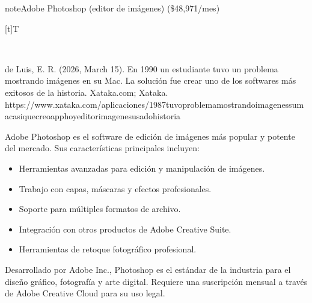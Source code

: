\documentclass[letterpaper,10pt,spanish]{sphinxmanual}
\let\sphinxpxdimen\pdfpxdimen\else\newdimen\sphinxpxdimen
\begin{document}
\begin{sphinxadmonition}{note}{Adobe Photoshop (editor de imágenes) (\$48,971/mes)}


\begin{savenotes}\sphinxattablestart
\sphinxthistablewithglobalstyle
\centering
\begin{tabulary}{\linewidth}[t]{T}
\sphinxtoprule
\sphinxtableatstartofbodyhook

\begin{sphinxfigure-in-table}
\centering
\capstart
\noindent\sphinxincludegraphics[width=360\sphinxpxdimen]{{image111}.png}
\label{\detokenize{1_guias/10ofimatica/G1012:id51}}\end{sphinxfigure-in-table}\relax
\\
\sphinxbottomrule
\end{tabulary}
\sphinxtableafterendhook\par
\sphinxattableend\end{savenotes}

\sphinxAtStartPar
%
\begin{footnote}[13]\sphinxAtStartFootnote
de Luis, E. R. (2026, March 15). En 1990 un estudiante tuvo un problema mostrando imágenes en su Mac. La solución fue crear uno de los softwares más exitosos de la historia. Xataka.com; Xataka. https://www.xataka.com/aplicaciones/1987\sphinxhyphen{}tuvo\sphinxhyphen{}problema\sphinxhyphen{}mostrando\sphinxhyphen{}imagenes\sphinxhyphen{}su\sphinxhyphen{}mac\sphinxhyphen{}asi\sphinxhyphen{}que\sphinxhyphen{}creo\sphinxhyphen{}app\sphinxhyphen{}hoy\sphinxhyphen{}editor\sphinxhyphen{}imagenes\sphinxhyphen{}usado\sphinxhyphen{}historia
%
\end{footnote} Adobe Photoshop es el software de edición de imágenes más popular y potente del mercado. Sus características principales incluyen:
\begin{itemize}
\item {} 
\sphinxAtStartPar
Herramientas avanzadas para edición y manipulación de imágenes.

\item {} 
\sphinxAtStartPar
Trabajo con capas, máscaras y efectos profesionales.

\item {} 
\sphinxAtStartPar
Soporte para múltiples formatos de archivo.

\item {} 
\sphinxAtStartPar
Integración con otros productos de Adobe Creative Suite.

\item {} 
\sphinxAtStartPar
Herramientas de retoque fotográfico profesional.

\end{itemize}

\sphinxAtStartPar
Desarrollado por Adobe Inc., Photoshop es el estándar de la industria para el diseño gráfico, fotografía y arte digital. Requiere una suscripción mensual a través de Adobe Creative Cloud para su uso legal.
\end{sphinxadmonition}
\end{document}
